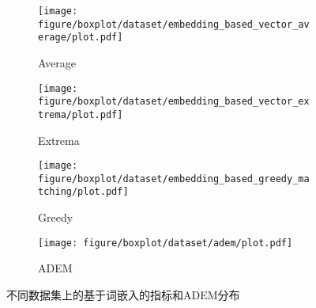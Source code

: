 \begin{figure}[H]
    \begin{subfigure}{0.25\linewidth}
        \texttt{[image: figure/boxplot/dataset/embedding\_based\_vector\_average/plot.pdf]}
        \centering
        \caption{Average}
    \end{subfigure}%
    \begin{subfigure}{0.25\linewidth}
        \texttt{[image: figure/boxplot/dataset/embedding\_based\_vector\_extrema/plot.pdf]}
        \centering
        \caption{Extrema}
    \end{subfigure}%
    \begin{subfigure}{0.25\linewidth}
        \texttt{[image: figure/boxplot/dataset/embedding\_based\_greedy\_matching/plot.pdf]}
        \centering
        \caption{Greedy}
    \end{subfigure}%
    \begin{subfigure}{0.25\linewidth}
        \texttt{[image: figure/boxplot/dataset/adem/plot.pdf]}
        \centering
        \caption{ADEM}
        \label{subfig:ADEM_dataset}
    \end{subfigure}
    \caption{不同数据集上的基于词嵌入的指标和ADEM分布}
    \label{fig:ADEM_EB_dataset}
\end{figure}
